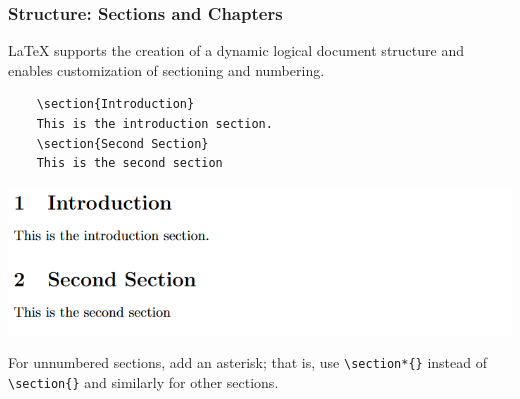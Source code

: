 \begin{frame}[fragile]
\frametitle{Structure: Sections and Chapters}
    \LaTeX{} supports the creation of a dynamic logical document structure and enables customization of sectioning and numbering. \pause
\begin{exampleblock}{}
    \begin{verbatim}
    \section{Introduction}
    This is the introduction section. 
    \section{Second Section}
    This is the second section
    \end{verbatim}
\end{exampleblock} 
\begin{center}
\includegraphics[width=0.8\linewidth]{img/sections_latex.png}
\end{center} \pause
\small For unnumbered sections, add an asterisk; that is, use \verb|\section*{}| instead of \verb|\section{}| and similarly for other sections.
\end{frame}


